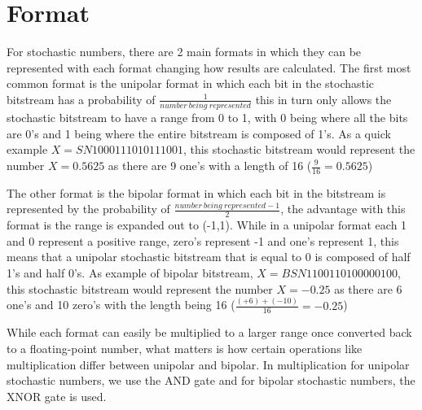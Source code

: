 \documentclass[a4paper,oneside,phd,etd]{BYUPhys}
\begin{document}
\section{Format}
For stochastic numbers, there are 2 main formats in which they can be represented with each format changing how results are calculated. The first most common format is the unipolar format in which each bit in the stochastic bitstream has a probability of $\frac{1}{number\ being\ represented}$ this in turn only allows the stochastic bitstream to have a range from 0 to 1, with 0 being where all the bits are 0's and 1 being where the entire bitstream is composed of 1's. As a quick example $X = SN 1000111010111001$, this stochastic bitstream would represent the number $X = 0.5625$ as there are 9 one's with a length of 16 ($\frac{9}{16} = 0.5625$)

The other format is the bipolar format in which each bit in the bitstream is represented by the probability of $\frac{number\ being\ represented-1}{2}$, the advantage with this format is the range is expanded out to (-1,1). While in a unipolar format each 1 and 0 represent a positive range, zero's represent -1 and one's represent 1, this means that a unipolar stochastic bitstream that is equal to 0 is composed of half 1's and half 0's. As example of bipolar bitstream, $X = BSN 1100110100000100$, this stochastic bitstream would represent the number $X = -0.25$ as there are 6 one's and 10 zero's with the length being 16 ($\frac{(+6) + (-10)}{16} = -0.25$)

While each format can easily be multiplied to a larger range once converted back to a floating-point number, what matters is how certain operations like multiplication differ between unipolar and bipolar. In multiplication for unipolar stochastic numbers, we use the AND gate and for bipolar stochastic numbers, the XNOR gate is used.
\end{document}
